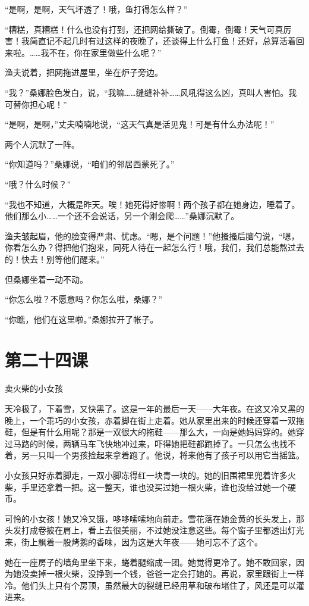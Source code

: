 \documentclass[12pt,UTF8]{ctexbook}
\begin{document}
“是啊，是啊，天气坏透了！哦，鱼打得怎么样？”

“糟糕，真糟糕！什么也没有打到，还把网给撕破了。倒霉，倒霉！天气可真厉害！我简直记不起几时有过这样的夜晚了，还谈得上什么打鱼！还好，总算活着回来啦。……我不在，你在家里做些什么呢？”

渔夫说着，把网拖进屋里，坐在炉子旁边。

“我？”桑娜脸色发白，说，“我嘛……缝缝补补……风吼得这么凶，真叫人害怕。我可替你担心呢！”

“是啊，是啊，”丈夫喃喃地说，“这天气真是活见鬼！可是有什么办法呢！”

两个人沉默了一阵。

“你知道吗？”桑娜说，“咱们的邻居西蒙死了。”

“哦？什么时候？”

“我也不知道，大概是昨天。唉！她死得好惨啊！两个孩子都在她身边，睡着了。他们那么小……一个还不会说话，另一个刚会爬……”桑娜沉默了。

渔夫皱起眉，他的脸变得严肃、忧虑。“嗯，是个问题！”他搔搔后脑勺说，“嗯，你看怎么办？得把他们抱来，同死人待在一起怎么行！哦，我们，我们总能熬过去的！快去！别等他们醒来。”

但桑娜坐着一动不动。

“你怎么啦？不愿意吗？你怎么啦，桑娜？”

“你瞧，他们在这里啦。”桑娜拉开了帐子。

\section{第二十四课}

卖火柴的小女孩

天冷极了，下着雪，又快黑了。这是一年的最后一天——大年夜。在这又冷又黑的晚上，一个乖巧的小女孩，赤着脚在街上走着。她从家里出来的时候还穿着一双拖鞋，但是有什么用呢？那是一双很大的拖鞋——那么大，一向是她妈妈穿的。她穿过马路的时候，两辆马车飞快地冲过来，吓得她把鞋都跑掉了。一只怎么也找不着，另一只叫一个男孩捡起来拿着跑了。他说，将来他有了孩子可以用它当摇篮。

小女孩只好赤着脚走，一双小脚冻得红一块青一块的。她的旧围裙里兜着许多火柴，手里还拿着一把。这一整天，谁也没买过她一根火柴，谁也没给过她一个硬币。

可怜的小女孩！她又冷又饿，哆哆嗦嗦地向前走。雪花落在她金黄的长头发上，那头发打成卷披在肩上，看上去很美丽，不过她没注意这些。每个窗子里都透出灯光来，街上飘着一股烤鹅的香味，因为这是大年夜——她可忘不了这个。

她在一座房子的墙角里坐下来，蜷着腿缩成一团。她觉得更冷了。她不敢回家，因为她没卖掉一根火柴，没挣到一个钱，爸爸一定会打她的。再说，家里跟街上一样冷。他们头上只有个房顶，虽然最大的裂缝已经用草和破布堵住了，风还是可以灌进来。
\end{document}

